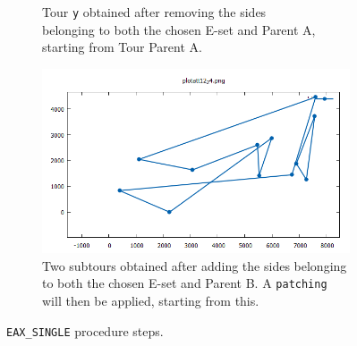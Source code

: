 \begin{figure}[!h]
\begin{subfigure}{.5\columnwidth}
		\caption{Tour \texttt{y} obtained after removing the sides \\ belonging to both the chosen E-set and Parent A, \\starting from Tour Parent A.}
		\label{fig:ga_rm_A}
	\end{subfigure}
	\begin{subfigure}{.5\columnwidth}
		\centering
		\includegraphics[width=\columnwidth]{../res/ga_add_B.png}
		\caption{Two subtours obtained after adding the sides belonging to both the chosen E-set and Parent B. A \texttt{patching} will then be applied, starting from this.}
		\label{fig:ga_add_B}
	\end{subfigure}
	\caption{\texttt{EAX\_SINGLE} procedure steps.}
	\label{fig:ga_eax_att12}
\end{figure}

